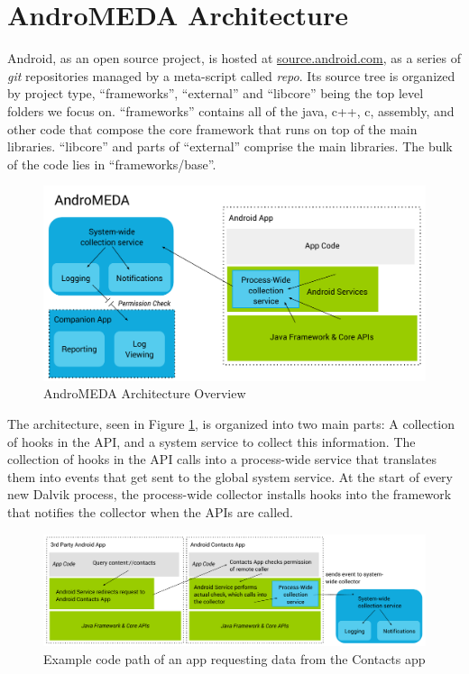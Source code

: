 \section{AndroMEDA Architecture}
Android, as an open source project, is hosted at \url{source.android.com}\citep{androidsource}, as a series of \textit{git} repositories managed by a meta-script called \textit{repo}. Its source tree is organized by project type, ``frameworks'', ``external'' and ``libcore'' being the top level folders we focus on. ``frameworks'' contains all of the java, c++, c, assembly, and other code that compose the core framework that runs on top of the main libraries. ``libcore'' and parts of ``external'' comprise the main libraries. The bulk of the code lies in ``frameworks/base''.


\begin{figure}[t]
\begin{center}
\includegraphics[width=1.0\columnwidth]{figs/AndroMEDA-Architecture-Overview}
\caption{AndroMEDA Architecture Overview}
\label{fig:andromedaoverview}
\end{center}
\end{figure}

The architecture, seen in Figure \ref{fig:andromedaoverview}, is organized into two main parts: A collection of hooks in the API, and a system service to collect this information. The collection of hooks in the API calls into a process-wide service that translates them into events that get sent to the global system service. At the start of every new Dalvik process, the process-wide collector installs hooks into the framework that notifies the collector when the APIs are called.

\begin{figure}[t]
\begin{center}
\includegraphics[width=1.0\columnwidth]{figs/AndroMEDA-Inter-App-Example}
\caption{Example code path of an app requesting data from the Contacts app}
\label{fig:interapp-example}
\end{center}
\end{figure}

